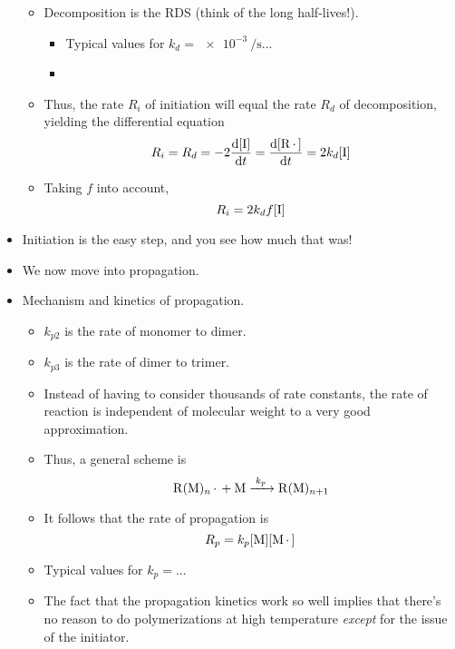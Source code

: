 \documentclass[../notes.tex]{subfiles}
\begin{document}
\begin{itemize}
\begin{itemize}
        \item Decomposition is the RDS (think of the long half-lives!).
        \begin{itemize}
            \item Typical values for $k_d=\SI{e-3}{\per\second}$...
            \item 
        \end{itemize}
        \item Thus, the rate $R_i$ of initiation will equal the rate $R_d$ of decomposition, yielding the differential equation
        \begin{equation*}
            R_i = R_d
            = -2\dv{[\ce{I}]}{t}
            = \dv{[\ce{R*}]}{t}
            = 2k_d[\ce{I}]
        \end{equation*}
        \item Taking $f$ into account,
        \begin{equation*}
            R_i = 2k_df[\ce{I}]
        \end{equation*}
    \end{itemize}
    \item Initiation is the easy step, and you see how much that was!
    \item We now move into propagation.
    \item Mechanism and kinetics of propagation.
    \begin{itemize}
        \item $k_{p2}$ is the rate of monomer to dimer.
        \item $k_{p3}$ is the rate of dimer to trimer.
        \item Instead of having to consider thousands of rate constants, the rate of reaction is independent of molecular weight to a very good approximation.
        \item Thus, a general scheme is
        \begin{equation*}
            \ce{R(M)_n* + M ->[$k_p$] R(M)_{n+1}}
        \end{equation*}
        \item It follows that the rate of propagation is
        \begin{equation*}
            R_p = k_p[\ce{M}][\ce{M*}]
        \end{equation*}
        \item Typical values for $k_p=$...
        \item The fact that the propagation kinetics work so well implies that there's no reason to do polymerizations at high temperature \emph{except} for the issue of the initiator.

\end{itemize}
\end{itemize}
\end{document}
